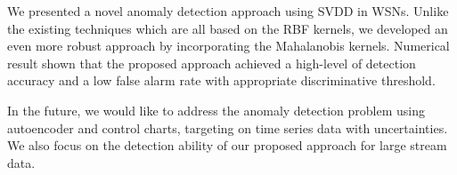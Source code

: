 \documentclass[conference]{IEEEtran}
\theoremstyle{problemstyle}
\begin{document}
We presented a novel anomaly detection approach using SVDD in WSNs. Unlike the existing techniques which are all based on the RBF kernels, we developed an even more robust approach by incorporating the Mahalanobis kernels. Numerical result shown that the proposed approach achieved a high-level of detection accuracy and a low false alarm rate with appropriate  discriminative threshold.  

In the future, we would like to address the anomaly detection problem using autoencoder and control charts, targeting on time series data with uncertainties. We also focus on the detection ability of our proposed approach for large stream data.



\end{document}
